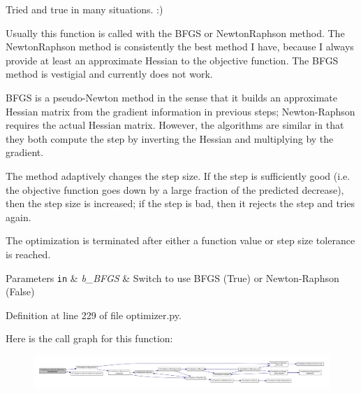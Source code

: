 Tried and true in many situations. \-:) \begin{DoxyVerb}   Usually this function is called with the BFGS or NewtonRaphson
   method.  The NewtonRaphson method is consistently the best
   method I have, because I always provide at least an
   approximate Hessian to the objective function.  The BFGS
   method is vestigial and currently does not work.

   BFGS is a pseudo-Newton method in the sense that it builds an
   approximate Hessian matrix from the gradient information in previous
   steps; Newton-Raphson requires the actual Hessian matrix.
   However, the algorithms are similar in that they both compute the
   step by inverting the Hessian and multiplying by the gradient.

   The method adaptively changes the step size.  If the step is
   sufficiently good (i.e. the objective function goes down by a
   large fraction of the predicted decrease), then the step size
   is increased; if the step is bad, then it rejects the step and
   tries again.

   The optimization is terminated after either a function value or
   step size tolerance is reached.
\end{DoxyVerb}



\begin{DoxyParams}[1]{Parameters}
\mbox{\tt in}  & {\em b\-\_\-\-B\-F\-G\-S} & Switch to use B\-F\-G\-S (True) or Newton-\/\-Raphson (False) \\
\hline
\end{DoxyParams}


Definition at line 229 of file optimizer.\-py.



Here is the call graph for this function\-:\nopagebreak
\begin{figure}[H]
\begin{center}
\leavevmode
\includegraphics[width=350pt]{classforcebalance_1_1optimizer_1_1Optimizer_a1d222f82239075ea0d6b9294b2f50e12_cgraph}
\end{center}
\end{figure}


